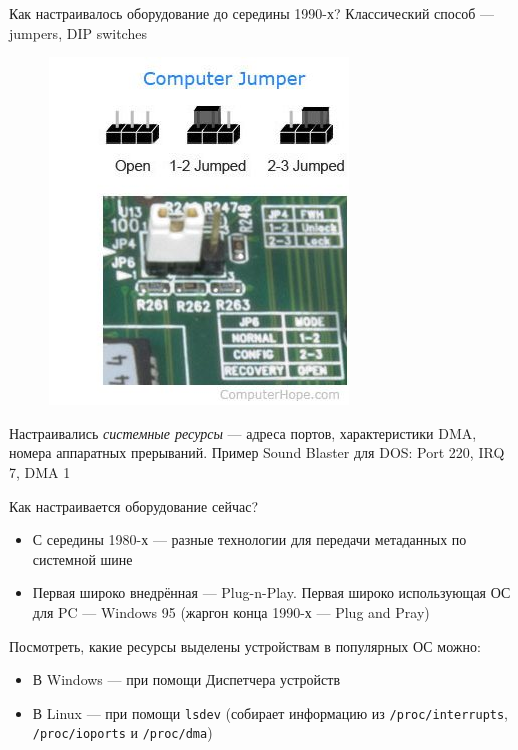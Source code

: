 \documentclass[xetex,aspectratio=43]{beamer}
\begin{document}
\begin{frame}{Как настраивалось оборудование до середины 1990-х?}
	Классический способ --- jumpers, DIP switches

	\begin{figure}
		\centering
		\includegraphics[height=0.5\textheight]{img/03.jumper.jpg}
	\end{figure}

	Настраивались \emph{системные ресурсы} --- адреса портов, характеристики DMA, номера аппаратных прерываний. Пример Sound Blaster для DOS: Port 220, IRQ 7, DMA 1
\end{frame}

\begin{frame}[fragile]{Как настраивается оборудование сейчас?}
	\begin{itemize}
		\item
		С середины 1980-х --- разные технологии для передачи метаданных по
		системной шине
		\item
		Первая широко внедрённая --- Plug-n-Play. Первая широко использующая            ОС для PC --- Windows 95 (жаргон конца 1990-х --- Plug and Pray)
	\end{itemize}

	\pause

	Посмотреть, какие ресурсы выделены устройствам в популярных ОС можно:

	\begin{itemize}
		\item
		В Windows --- при помощи Диспетчера устройств
		\item
		В Linux --- при помощи \texttt{lsdev} (собирает информацию из
		\texttt{/proc/interrupts}, \texttt{/proc/ioports} и
		\texttt{/proc/dma})
	\end{itemize}
\end{frame}
\end{document}
